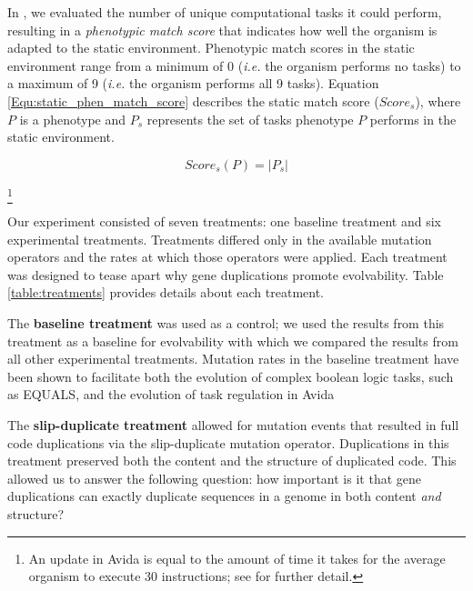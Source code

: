In , we evaluated the number of unique computational tasks it could perform, resulting in a \textit{phenotypic match score} that indicates how well the organism is adapted to the static environment. Phenotypic match scores in the static environment range from a minimum of 0 (\textit{i.e.} the organism performs no tasks) to a maximum of 9 (\textit{i.e.} the organism performs all 9 tasks). %
Equation \ref{Equ:static_phen_match_score} describes the static match score ($Score_s$), where $P$ is a phenotype and $P_s$ represents the set of tasks phenotype $P$ performs in the static environment.

\begin{equation}
Score_s(P) = |P_{s}|
\label{Equ:static_phen_match_score}
\end{equation}

\footnote{An update in Avida is equal to the amount of time it takes for the average organism to execute 30 instructions; see \citep{Ofria:2009avida} for further detail.}



Our experiment consisted of seven treatments: one baseline treatment and six experimental treatments. Treatments differed only in the available mutation operators and the rates at which those operators were applied. Each treatment was designed to tease apart why gene duplications promote evolvability. Table \ref{table:treatments} provides details about each treatment.

The \textbf{baseline treatment} was used as a control; we used the results from this treatment as a baseline for evolvability with which we compared the results from all other experimental treatments. Mutation rates in the baseline treatment have been shown to facilitate both the evolution of complex boolean logic tasks, such as EQUALS, and the evolution of task regulation in Avida \citep{lenski2003evolutionary, Lalejini:2016plasticity}

The \textbf{slip-duplicate treatment} allowed for mutation events that resulted in full code duplications via the slip-duplicate mutation operator. Duplications in this treatment preserved both the content and the structure of duplicated code. This allowed us to answer the following question: how important is it that gene duplications can exactly duplicate sequences in a genome in both content \textit{and} structure?

